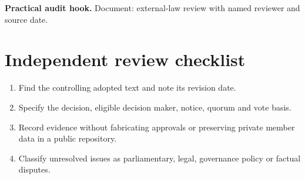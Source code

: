 \documentclass[11pt]{article}
\begin{document}
\textbf{Practical audit hook.} Document: external-law review with named reviewer and source date.

\section{Independent review checklist}
\begin{enumerate}[leftmargin=*,itemsep=4pt]
\item Find the controlling adopted text and note its revision date.
\item Specify the decision, eligible decision maker, notice, quorum and vote basis.
\item Record evidence without fabricating approvals or preserving private member data in a public repository.
\item Classify unresolved issues as parliamentary, legal, governance policy or factual disputes.
\end{enumerate}
\end{document}
